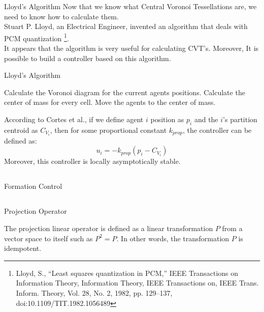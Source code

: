 \documentclass[t]{beamer}
\begin{document}
\begin{frame}[label=lloydsalg1]{Lloyd's Algorithm}
Now that we know what Central Voronoi Tessellations are, we need to know how to calculate them. \\
Stuart P. Lloyd, an Electrical Engineer, invented an algorithm that deals with PCM quantization \footnote{Lloyd, S., “Least squares quantization in PCM,” IEEE Transactions on Information Theory, Information Theory, IEEE Transactions on, IEEE Trans. Inform. Theory, Vol. 28, No. 2, 1982, pp. 129–137, doi:10.1109/TIT.1982.1056489}.
\\
It appears that the algorithm is very useful for calculating CVT's. Moreover, It is possible to build a controller based on this algorithm.
\end{frame}

\begin{frame}[label=lloydsalg2]{Lloyd's Algorithm}
\begin{algorithm}[H]
\caption{Lloyd's Algorithm}\label{LloydAlgo}
\begin{algorithmic}[1]
\State Calculate the Voronoi diagram for the current agents positions.
\State Calculate the center of mass for every cell.
\State Move the agents to the center of mass.
\end{algorithmic}
\end{algorithm}

According to Cortes et al., if we define agent $i$ position as $p_i$ and the $i$'s partition centroid as $C_{V_{i}}$, then for some proportional constant $k_{prop}$, the controller can be defined as:
\begin{equation} \label{LloydsContol}
u_{i} = -k_{prop}\left( p_i - C_{V_{i}} \right)
\end{equation} 
Moreover, this controller is locally asymptotically stable.
\end{frame}

\subsection[Formation Control]{}
\begin{frame}[label=sl2]{Formation Control}

\end{frame}

\subsection[Projection Operator]{}
\begin{frame}[label=sl2]{Projection Operator}

The projection linear operator is defined as a linear transformation $P$ from a vector space to itself such as $P^2 = P$. In other words, the transformation $P$ is idempotent.

\end{frame}
\end{document}
